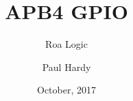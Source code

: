\usepackage{pkg/roalogictitle}


\title{APB4 GPIO}
\author{Roa Logic}
\date{October, 2017}
\author{Paul Hardy}

\pagestyle{fancy}
\fancyhf{}
\fancyhead[R]{\thepage}
